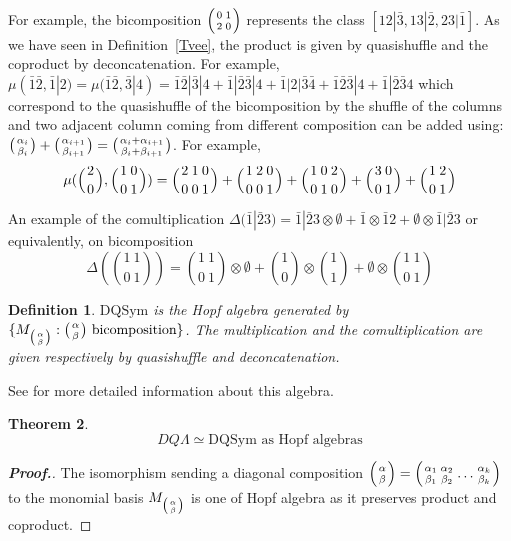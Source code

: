 \documentclass[11pt,reqno]{amsart}
\numberwithin{equation}{section}
\newtheorem{theorem}{Theorem}
\newtheorem{definition}[theorem]{Definition}
\def\DQL{DQ\Lambda}
\def\DQSym{\mathrm{DQSym}}
\begin{document}
For example, the bicomposition $\Bigl{(}{0\atop 2} {1\atop 0}\Bigr{)}$ represents the class $[12|\bar{3},13|\bar{2},23|\bar{1}]$. As we have seen in Definition~\ref{Tvee}, the product is given by quasishuffle and the coproduct by deconcatenation. For example,
$\mu(\bar{1}\bar{2},\bar{1}|2) = \mu(\bar{1}\bar{2},\bar{3}|4) = \bar{1}\bar{2}|\bar{3}|4 + \bar{1}|\bar{2}\bar{3}|4 + \bar{1}|2|\bar{3}\bar{4}+ \bar{1}\bar{2}\bar{3}|4 + \bar{1}|\bar{2}\bar{3}4$ which correspond to the quasishuffle of the bicomposition by the shuffle of the columns and two adjacent column coming from different composition can be added using: $ \bigl{(}{\alpha_i \atop \beta_i}\bigr{)} +\bigl{(}{\alpha_{i+1} \atop \beta_{i+1}}\bigr{)} =\bigl{(}{\alpha_i + \alpha_{i+1} \atop \beta_i + \beta_{i+1}}\bigr{)}$.
For example,
\begin{equation}
\mu( \Bigl{(} {2\atop 0} \Bigr{)} ,\Bigl{(} {1\atop 0} {0\atop 1}\Bigr{)})= \Bigl{(} {2\atop 0} {1\atop 0} {0\atop 1}\Bigr{)}+\Bigl{(} {1\atop 0} {2\atop 0}{0\atop 1}\Bigr{)}+\Bigl{(} {1\atop 0} {0\atop 1}{2\atop 0}\Bigr{)}+\Bigl{(} {3\atop 0} {0\atop 1}\Bigr{)}+\Bigl{(} {1\atop 0} {2\atop 1}\Bigr{)}
\end{equation}

An example of the comultiplication $\Delta(\bar{1}|\bar{2}3)= \bar{1}|\bar{2}3\otimes \emptyset +\bar{1}\otimes \bar{1}2+
\emptyset\otimes \bar{1}|\bar{2}3$ or equivalently, on bicomposition
$$\Delta({ 1\: 1 \choose 0\: 1})= { 1\: 1 \choose 0\: 1} \otimes \emptyset + {1\choose 0}\otimes {1\choose 1} + \emptyset \otimes { 1\: 1 \choose 0\: 1}$$


\begin{definition}
$\DQSym$ is the Hopf algebra generated by $\{M_{ \bigl{(}{\alpha \atop\beta} \bigr{)} } : \bigl{(}{\alpha \atop\beta} \bigr{)} \text{ bicomposition}\}$. The multiplication and the comultiplication are given respectively by quasishuffle and deconcatenation.
\end{definition}
See \cite{AB} for more detailed information about this algebra. 


\begin{theorem}
\begin{equation}
\DQL \simeq \DQSym \text{ as Hopf algebras}
\end{equation}
\end{theorem}

\begin{proof}[\bf Proof.] 
The isomorphism sending a diagonal composition $\Bigl{(} {\alpha \atop \beta} \Bigr{)}=\Bigl{(} {\alpha_1\atop\beta_1} {\alpha_2\atop\beta_2} \dots {\alpha_k \atop\beta_k}\Bigr{)}$ to the monomial basis $M_{\bigl{(} {\alpha \atop \beta} \bigr{)}}$ is one of Hopf algebra as it preserves product and coproduct.
\end{proof}
\end{document}

